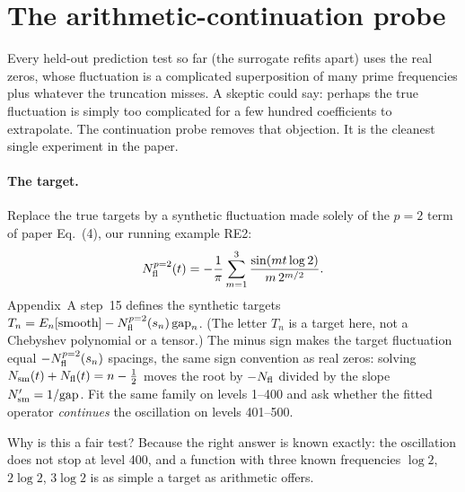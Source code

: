 \section{The arithmetic-continuation probe}\label{sec:paper-memorization-probe}

Every held-out prediction test so far (the surrogate refits apart) uses the real zeros, whose fluctuation is a complicated superposition of many prime frequencies plus whatever the truncation misses. A skeptic could say: perhaps the true fluctuation is simply too complicated for a few hundred coefficients to extrapolate. The continuation probe removes that objection. It is the cleanest single experiment in the paper.

\paragraph{The target.} Replace the true targets by a synthetic fluctuation made solely of the $p=2$ term of paper Eq.~(4), our running example RE2:
\begin{equation}
N^{p=2}_{\rm fl}(t)=-\frac1\pi\sum_{m=1}^{3}\frac{\sin(mt\log2)}{m\,2^{m/2}} .
\label{eq:paper-memorization-re2}
\end{equation}
Appendix~A step~15 defines the synthetic targets $T_n=E_n[\text{smooth}]-N^{p=2}_{\rm fl}(s_n)\,\mathrm{gap}_n$. (The letter $T_n$ is a target here, not a Chebyshev polynomial or a tensor.) The minus sign makes the target fluctuation equal $-N^{p=2}_{\rm fl}(s_n)$ spacings, the same sign convention as real zeros: solving $N_{\mathrm{sm}}(t)+N_{\rm fl}(t)=n-\tfrac12$ moves the root by $-N_{\rm fl}$ divided by the slope $N_{\mathrm{sm}}'=1/\mathrm{gap}$. Fit the same family on levels 1--400 and ask whether the fitted operator \emph{continues} the oscillation on levels 401--500.

Why is this a fair test? Because the right answer is known exactly: the oscillation does not stop at level 400, and a function with three known frequencies $\log2$, $2\log2$, $3\log2$ is as simple a target as arithmetic offers.

